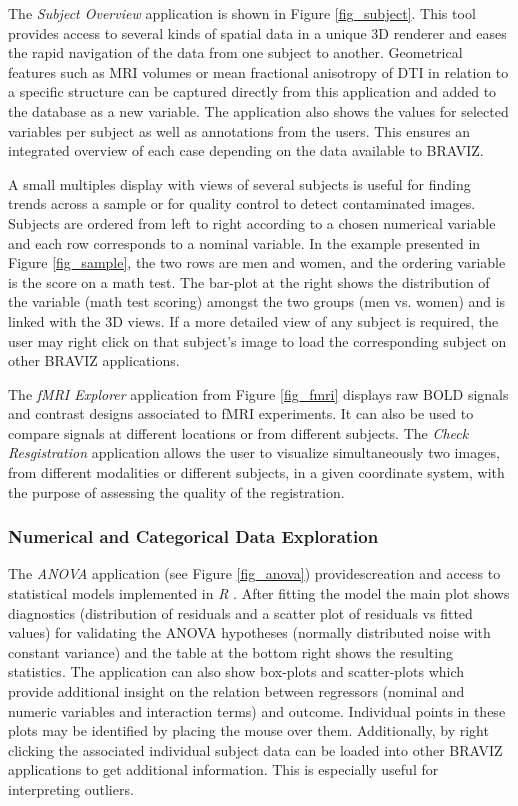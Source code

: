 \documentclass{frontiersHLTH}
\begin{document}
The \emph{Subject Overview} application is shown in Figure \ref{fig_subject}. This tool  provides access to several kinds of spatial data in a unique 3D renderer and eases the rapid navigation of the data from one subject to another. Geometrical features such as MRI volumes or mean fractional anisotropy of DTI in relation to a specific structure can be captured directly from this application and added to the database as a new variable. The application also shows the values for selected variables per subject as well as annotations from the users. This ensures an integrated overview of each case depending on the data available to BRAVIZ.

A small multiples display \cite{tufte_visual_1983} with views  of several subjects is useful for finding trends across a sample or for quality control to detect contaminated images. Subjects are ordered from left to right according to a chosen numerical variable and each row corresponds to a nominal variable. In the example presented in Figure \ref{fig_sample}, the two rows are men and women, and the ordering variable is the score on a math test. The bar-plot at the right shows the distribution of the variable (math test scoring) amongst the two groups (men vs. women) and is linked with the 3D views. If a more detailed view of any subject is required, the user may right click on that subject’s image to load the corresponding subject on other BRAVIZ applications.

The \emph{fMRI Explorer} application from Figure \ref{fig_fmri} displays raw BOLD signals and contrast designs associated to fMRI experiments. It can also be used to compare signals at different locations or from different subjects. The \emph{Check Resgistration} application allows the user to visualize simultaneously two images, from different modalities or different subjects, in a given coordinate system, with the purpose of assessing the quality of the registration.



\subsubsection{Numerical and Categorical Data Exploration}

The \emph{ANOVA} application (see Figure \ref{fig_anova}) providescreation and access to statistical models implemented in \emph{R} \cite{team_r:_2012}. After fitting the model the main plot shows diagnostics (distribution of residuals and a scatter plot of residuals vs fitted values) for validating the ANOVA hypotheses (normally distributed noise with constant variance) and the table at the bottom right shows the resulting statistics. The application can also show box-plots and scatter-plots which provide additional insight on the relation between regressors (nominal and numeric variables and interaction terms) and outcome. Individual points in these plots may be identified by placing the mouse over them. Additionally, by right clicking the associated individual subject data can be loaded into other BRAVIZ applications to get additional information. This is especially useful for interpreting outliers.
\end{document}
